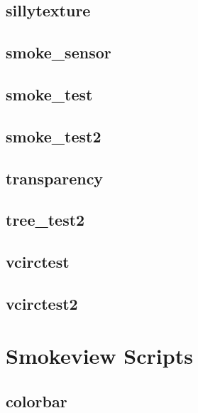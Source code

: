 \documentclass[11pt,twoside]{book}
\begin{document}
\section{sillytexture}

\section{smoke\_sensor}
\label{FDSsmokesensor}

\section{smoke\_test}
\label{FDSsmoketest}

\section{smoke\_test2}
\label{FDSsmoketest2}

\section{transparency}
\label{FDStransparency}

\section{tree\_test2}

\section{vcirctest}

\section{vcirctest2}

\chapter{Smokeview Scripts}
\label{smvscripts}

\section{colorbar}
\label{SSFcolorbar}
\end{document}
